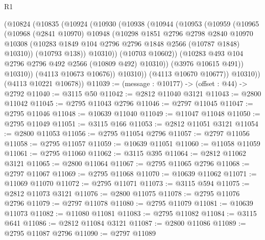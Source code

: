 \begin{lexlean}{R1}
\begin{coremodule}
              (@10824
                (@10835
                  (@10924
                    (@10930
                      (@10938
                        (@10944
                          (@10953
                            (@10959
                              (@10965
                                (@10968
                                  (@2841 @10970)
                                  @10948
                                  (@10298
                                    @1851
                                    @2796
                                    @2798
                                    @2840
                                    @10970
                                    @10308
                                    (@10283
                                      @1849
                                      @104
                                      @2796
                                      @2796
                                      @1848
                                      @2566
                                      (@10787 @1848)
                                      @10310))
                                  (@10793 @138))
                                @10310))
                            (@10703 @10602))
                          (@10283 @493 @104 @2796 @2796 @492 @2566 (@10809 @492) @10310))
                        (@3976 @10615 @491))
                      @10310))
                  (@4113 @10673 @10676))
                @10310))
            (@4113 @10670 @10677))
          @10310))
      (@4113 @10221 @10678))
@11039 := (message : @10177) -> (offset : @44) -> @2792
@11040 := @3115 @50
@11042 := @2812 @11040 @3121
@11043 := @2800 @11042
@11045 := @2795 @11043 @2796
@11046 := @2797 @11045
@11047 := @2795 @11046
@11048 := @10639 @11040
@11049 := @11047 @11048
@11050 := @2795 @11049
@11051 := @3115 @166
@11053 := @2812 @11051 @3121
@11054 := @2800 @11053
@11056 := @2795 @11054 @2796
@11057 := @2797 @11056
@11058 := @2795 @11057
@11059 := @10639 @11051
@11060 := @11058 @11059
@11061 := @2795 @11060
@11062 := @3115 @395
@11064 := @2812 @11062 @3121
@11065 := @2800 @11064
@11067 := @2795 @11065 @2796
@11068 := @2797 @11067
@11069 := @2795 @11068
@11070 := @10639 @11062
@11071 := @11069 @11070
@11072 := @2795 @11071
@11073 := @3115 @594
@11075 := @2812 @11073 @3121
@11076 := @2800 @11075
@11078 := @2795 @11076 @2796
@11079 := @2797 @11078
@11080 := @2795 @11079
@11081 := @10639 @11073
@11082 := @11080 @11081
@11083 := @2795 @11082
@11084 := @3115 @641
@11086 := @2812 @11084 @3121
@11087 := @2800 @11086
@11089 := @2795 @11087 @2796
@11090 := @2797 @11089

\end{coremodule}
\end{lexlean}
